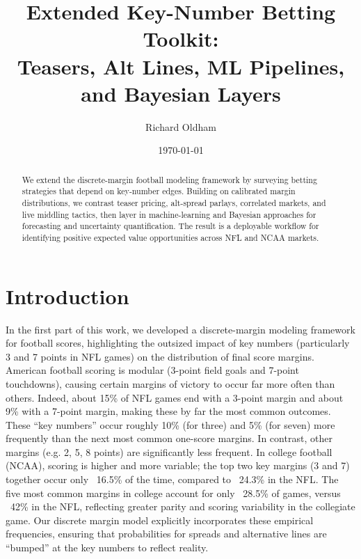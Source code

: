 \documentclass[11pt]{amsart}
\title[Extended Key-Number Betting Toolkit]{Extended Key-Number Betting Toolkit: \\ Teasers, Alt Lines, ML Pipelines, and Bayesian Layers}
\author{Richard Oldham}
\date{\today}
\begin{document}
\begin{abstract}
We extend the discrete-margin football modeling framework by surveying betting strategies that depend on key-number edges. Building on calibrated margin distributions, we contrast teaser pricing, alt-spread parlays, correlated markets, and live middling tactics, then layer in machine-learning and Bayesian approaches for forecasting and uncertainty quantification. The result is a deployable workflow for identifying positive expected value opportunities across NFL and NCAA markets.
\end{abstract}

\maketitle

\section{Introduction}
In the first part of this work, we developed a discrete-margin modeling framework for football scores, highlighting the outsized impact of key numbers (particularly 3 and 7 points in NFL games) on the distribution of final score margins. American football scoring is modular (3-point field goals and 7-point touchdowns), causing certain margins of victory to occur far more often than others. Indeed, about 15\% of NFL games end with a 3-point margin and about 9\% with a 7-point margin, making these by far the most common outcomes. These ``key numbers'' occur roughly 10\% (for three) and 5\% (for seven) more frequently than the next most common one-score margins. In contrast, other margins (e.g. 2, 5, 8 points) are significantly less frequent. In college football (NCAA), scoring is higher and more variable; the top two key margins (3 and 7) together occur only ~16.5\% of the time, compared to ~24.3\% in the NFL. The five most common margins in college account for only ~28.5\% of games, versus ~42\% in the NFL, reflecting greater parity and scoring variability in the collegiate game. Our discrete margin model explicitly incorporates these empirical frequencies, ensuring that probabilities for spreads and alternative lines are ``bumped'' at the key numbers to reflect reality.
\end{document}
